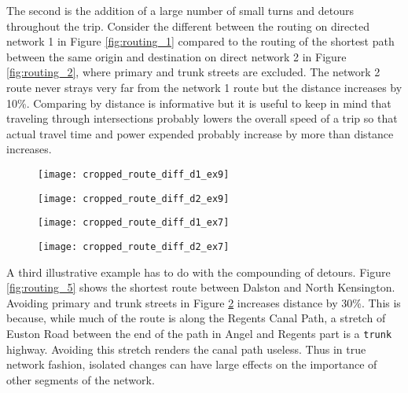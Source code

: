 The second is the addition of a large number of small turns and detours throughout the trip. Consider the different between the routing on directed network 1 in Figure \ref{fig:routing_1} compared to the routing of the shortest path between the same origin and destination on direct network 2 in Figure \ref{fig:routing_2}, where primary and trunk streets are excluded. The network 2 route never strays very far from the network 1 route but the distance increases by 10\%. Comparing by distance is informative but it is useful to keep in mind that traveling through intersections probably lowers the overall speed of a trip so that actual travel time and power expended probably increase by more than distance increases. 

\begin{figure}
\centering
\begin{minipage}{.5\textwidth}
  \centering
  \texttt{[image: cropped\_route\_diff\_d1\_ex9]}
  \label{fig:routing_3}
\end{minipage}%
\begin{minipage}{.5\textwidth}
  \centering
  \texttt{[image: cropped\_route\_diff\_d2\_ex9]}
  \label{fig:routing_4}
\end{minipage}
\end{figure}

\begin{figure}
\centering
\begin{minipage}{.5\textwidth}
  \centering
  \texttt{[image: cropped\_route\_diff\_d1\_ex7]}
  \label{fig:routing_5}
\end{minipage}%
\begin{minipage}{.5\textwidth}
  \centering
  \texttt{[image: cropped\_route\_diff\_d2\_ex7]}
  \label{fig:routing_6}
\end{minipage}
\end{figure}

A third illustrative example has to do with the compounding of detours. Figure \ref{fig:routing_5} shows the shortest route between Dalston and North Kensington. Avoiding primary and trunk streets in Figure \ref{fig:routing_6} increases distance by 30\%. This is because, while much of the route is along the Regents Canal Path, a stretch of Euston Road between the end of the path in Angel and Regents part is a \texttt{trunk} highway. Avoiding this stretch renders the canal path useless. Thus in true network fashion, isolated changes can have large effects on the importance of other segments of the network. 

